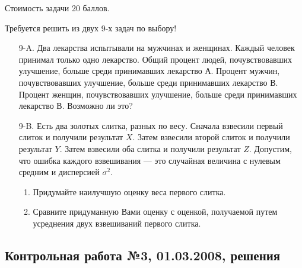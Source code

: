 Стоимость задачи 20 баллов.

Требуется решить \textbf{} из двух 9-х задач по
выбору!

\begin{enumerate}
\item[9-A.] Два лекарства испытывали на мужчинах и женщинах. Каждый
человек принимал только одно лекарство. Общий процент людей,
почувствовавших улучшение, больше среди принимавших лекарство А.
Процент мужчин, почувствовавших улучшение, больше среди принимавших лекарство В. Процент женщин, почувствовавших улучшение, больше среди принимавших лекарство В. Возможно ли это?

\item[9-B.] Есть два золотых слитка, разных по весу. Сначала взвесили первый слиток и получили результат $X$. Затем взвесили второй слиток и получили результат $Y$. Затем взвесили оба слитка и получили результат $Z$. Допустим, что ошибка каждого взвешивания — это случайная величина с нулевым средним и дисперсией $\sigma^{2}$.
\begin{enumerate}
\item Придумайте наилучшую оценку веса первого слитка.
\item Сравните придуманную Вами оценку с оценкой, получаемой путем усреднения двух взвешиваний первого слитка.
\end{enumerate}
\end{enumerate}


\subsection{Контрольная работа №3, 01.03.2008, решения}

